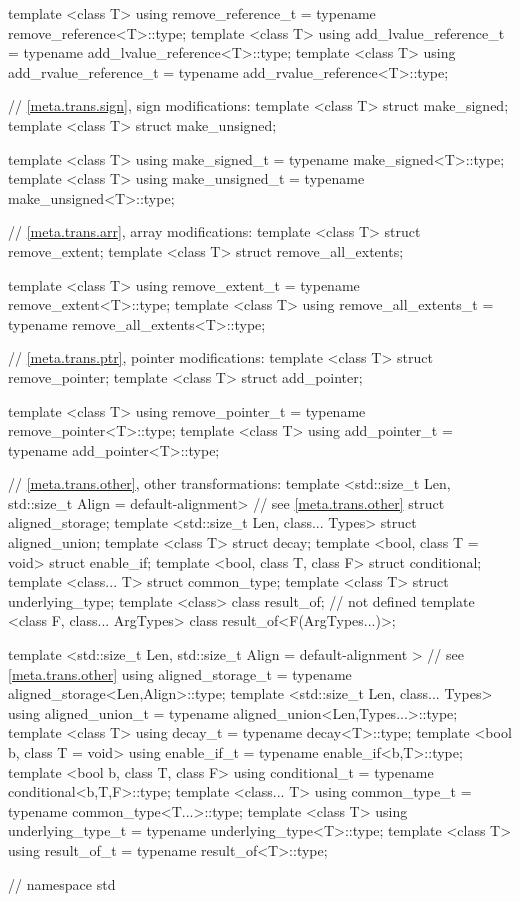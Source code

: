 \begin{codeblock}
{  template <class T>
    using remove_reference_t     = typename remove_reference<T>::type;
  template <class T>
    using add_lvalue_reference_t = typename add_lvalue_reference<T>::type;
  template <class T>
    using add_rvalue_reference_t = typename add_rvalue_reference<T>::type;

  // \ref{meta.trans.sign}, sign modifications:
  template <class T> struct make_signed;
  template <class T> struct make_unsigned;

  template <class T>
    using make_signed_t   = typename make_signed<T>::type;
  template <class T>
    using make_unsigned_t = typename make_unsigned<T>::type;

  // \ref{meta.trans.arr}, array modifications:
  template <class T> struct remove_extent;
  template <class T> struct remove_all_extents;

  template <class T>
    using remove_extent_t      = typename remove_extent<T>::type;
  template <class T>
    using remove_all_extents_t = typename remove_all_extents<T>::type;

  // \ref{meta.trans.ptr}, pointer modifications:
  template <class T> struct remove_pointer;
  template <class T> struct add_pointer;

  template <class T>
    using remove_pointer_t = typename remove_pointer<T>::type;
  template <class T>
    using add_pointer_t    = typename add_pointer<T>::type;

  // \ref{meta.trans.other}, other transformations:
  template <std::size_t Len,
            std::size_t Align = default-alignment>   // see \ref{meta.trans.other}
    struct aligned_storage;      
  template <std::size_t Len, class... Types> struct aligned_union;
  template <class T> struct decay;
  template <bool, class T = void> struct enable_if;
  template <bool, class T, class F> struct conditional;
  template <class... T> struct common_type;
  template <class T> struct underlying_type;
  template <class> class result_of;   // not defined
  template <class F, class... ArgTypes> class result_of<F(ArgTypes...)>;

  template <std::size_t Len,
            std::size_t Align = default-alignment > // see \ref{meta.trans.other}
    using aligned_storage_t = typename aligned_storage<Len,Align>::type;
  template <std::size_t Len, class... Types>
    using aligned_union_t   = typename aligned_union<Len,Types...>::type;
  template <class T>
    using decay_t           = typename decay<T>::type;
  template <bool b, class T = void>
    using enable_if_t       = typename enable_if<b,T>::type;
  template <bool b, class T, class F>
    using conditional_t     = typename conditional<b,T,F>::type;
  template <class... T>
    using common_type_t     = typename common_type<T...>::type;
  template <class T>
    using underlying_type_t = typename underlying_type<T>::type;
  template <class T>
    using result_of_t       = typename result_of<T>::type;  
} // namespace std
\end{codeblock}

